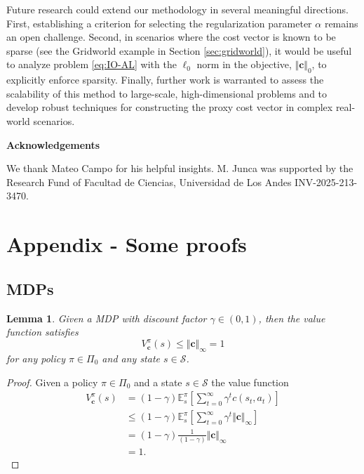 \documentclass[10pt]{article} %
\newtheorem{lemma}{Lemma}
\def\vc{{\bm{c}}}
\def\evc{{c}}
\def\evV{{V}}
\newcommand{\E}{\mathbb{E}}
\newcommand{\St}{\mathcal{S}}
\begin{document}
Future research could extend our methodology in several meaningful directions. First, establishing a criterion for selecting the regularization parameter $\alpha$ remains an open challenge. Second, in scenarios where the cost vector is known to be sparse (see the Gridworld example in Section \ref{sec:gridworld}), it would be useful to analyze problem \eqref{eq:IO-AL} with the $\ell_0$ norm in the objective, $\Vert \vc\Vert_0$, to explicitly enforce sparsity. Finally, further work is warranted to assess the scalability of this method to large-scale, high-dimensional problems and to develop robust techniques for constructing the proxy cost vector in complex real-world scenarios.

\textbf{Acknowledgements}

We thank Mateo Campo for his helpful insights. M. Junca was supported by the Research Fund of Facultad de Ciencias, Universidad de Los Andes INV-2025-213-3470.





\appendix
\section{Appendix - Some proofs}
\subsection{MDPs}
\begin{lemma} \label{lemma:boundValueFunction}
    Given a MDP with discount factor $\gamma\in(0,1)$, then the value function satisfies $$\evV^\pi_\vc(s) \leq \Vert \vc \Vert_\infty = 1$$  for any policy $\pi\in\Pi_0$ and any state $s\in\St$.
\end{lemma}
\begin{proof}
    Given a policy $\pi\in\Pi_0$ and a state $s\in\St$ the value function
    \begin{align*}
        \evV^\pi_\vc (s) &=  (1-\gamma)\E^\pi_{s}\left[ \sum\limits_{t=0}^\infty \gamma^t \evc(s_t,a_t)\right]\\
        &\leq (1-\gamma)\E^\pi_s \left[ \sum\limits_{t=0}^\infty \gamma^t \Vert \vc \Vert_\infty\right]\\
        &= (1-\gamma)\frac{1}{(1-\gamma)}\Vert\vc\Vert_\infty\\
        &= 1.
    \end{align*}
\end{proof}
\end{document}
